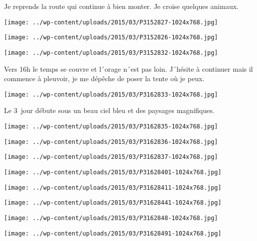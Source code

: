\pagebreak
 Je reprends la route qui continue à bien monter. Je croise quelques animaux.
\begin{center} \texttt{[image: ../wp-content/uploads/2015/03/P3152827-1024x768.jpg]} \end{center}
\begin{center} \texttt{[image: ../wp-content/uploads/2015/03/P3152826-1024x768.jpg]} \end{center}
\begin{center} \texttt{[image: ../wp-content/uploads/2015/03/P3152832-1024x768.jpg]} \end{center}

 Vers 16h le temps se couvre et l´orage n´est pas loin. J´hésite à continuer mais il commence à pleuvoir, je me dépêche de poser la tente où je peux.
\begin{center} \texttt{[image: ../wp-content/uploads/2015/03/P3162833-1024x768.jpg]} \end{center}

\pagebreak
 Le 3\ieme\ jour débute sous un beau ciel bleu et des paysages magnifiques. 
\begin{center} \texttt{[image: ../wp-content/uploads/2015/03/P3162835-1024x768.jpg]} \end{center}
\begin{center} \texttt{[image: ../wp-content/uploads/2015/03/P3162836-1024x768.jpg]} \end{center}
\begin{center} \texttt{[image: ../wp-content/uploads/2015/03/P3162837-1024x768.jpg]} \end{center}
\begin{center} \texttt{[image: ../wp-content/uploads/2015/03/P31628401-1024x768.jpg]} \end{center}
\begin{center} \texttt{[image: ../wp-content/uploads/2015/03/P31628411-1024x768.jpg]} \end{center}
\begin{center} \texttt{[image: ../wp-content/uploads/2015/03/P31628441-1024x768.jpg]} \end{center}
\begin{center} \texttt{[image: ../wp-content/uploads/2015/03/P3162848-1024x768.jpg]} \end{center}
\begin{center} \texttt{[image: ../wp-content/uploads/2015/03/P31628491-1024x768.jpg]} \end{center}

